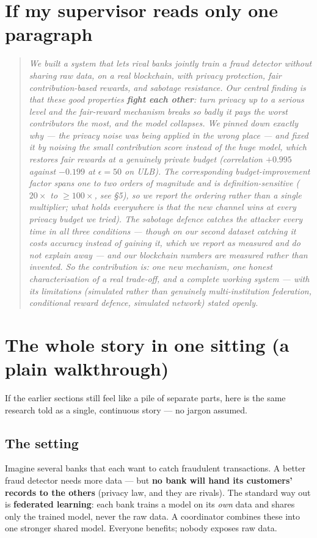 \documentclass[11pt]{article}
\begin{document}
\section{If my supervisor reads only one paragraph}

\begin{quote}
\itshape
We built a system that lets rival banks jointly train a fraud detector without sharing raw data, on a
real blockchain, with privacy protection, fair contribution-based rewards, and sabotage resistance. Our
central finding is that these good properties \textbf{fight each other}: turn privacy up to a serious
level and the fair-reward mechanism breaks so badly it pays the worst contributors the most, and the
model collapses. We pinned down exactly why --- the privacy noise was being applied in the wrong place
--- and fixed it by noising the small contribution score instead of the huge model, which restores fair
rewards at a genuinely private budget (correlation $+0.995$ against $-0.199$ at $\epsilon=50$ on ULB).
The corresponding budget-improvement factor spans one to two orders of magnitude and is
definition-sensitive ($20\times$ to $\geq\!100\times$, see \S5), so we report the ordering rather than a
single multiplier; what holds
everywhere is that the new channel wins at every privacy budget we tried). The sabotage defence catches
the attacker every time in all three conditions --- though on our second dataset catching it \emph{costs}
accuracy instead of gaining it, which we report as measured and do not explain away --- and our
blockchain numbers are measured rather than invented. So the contribution is: one new mechanism, one
honest characterisation of a real trade-off, and a complete working system --- with its limitations
(simulated rather than genuinely multi-institution federation, conditional reward defence, simulated
network) stated openly.
\end{quote}

\section{The whole story in one sitting (a plain walkthrough)}

If the earlier sections still feel like a pile of separate parts, here is the same research told as a
single, continuous story --- no jargon assumed.

\subsection{The setting}
Imagine several banks that each want to catch fraudulent transactions. A better fraud detector needs more
data --- but \textbf{no bank will hand its customers' records to the others} (privacy law, and they are
rivals). The standard way out is \textbf{federated learning}: each bank trains a model on its
\emph{own} data and shares only the trained model, never the raw data. A coordinator combines these into
one stronger shared model. Everyone benefits; nobody exposes raw data.
\end{document}
